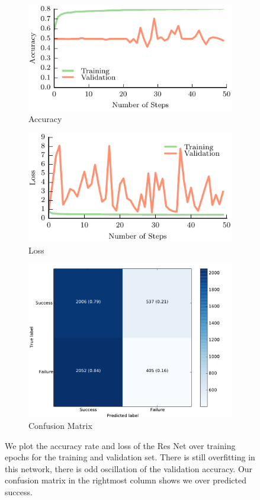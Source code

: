\begin{figure}[t!]
    \centering
    \begin{subfigure}[t]{0.32\textwidth}
        \includegraphics[width=0.9\columnwidth]{figs/res_net_accuracy.pdf}
        \caption{Accuracy} \label{fig:accuracy_res}
        \end{subfigure}
    \begin{subfigure}[t]{0.32\textwidth}
        \includegraphics[width=0.9\columnwidth]{figs/res_net_loss.pdf}
        \caption{Loss} \label{fig:loss_res}
    \end{subfigure}
		\begin{subfigure}[t]{0.32\textwidth}
        \includegraphics[width=0.8\columnwidth]{figs/confusion_resnet.pdf}
        \caption{Confusion Matrix} \label{fig:confusion_res}
    \end{subfigure}
\caption{We plot the accuracy rate and loss of the Res Net over training epochs for the training and validation set. There is still overfitting in this network, there is odd oscillation of the validation accuracy. Our confusion matrix in the rightmost column shows we over predicted success.} \label{fig:resnet_results}
\end{figure}

